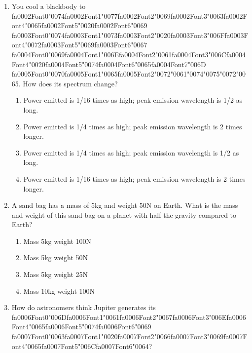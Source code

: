 \documentclass[12pt]{article}
\begin{document}
\begin{enumerate}[label=\arabic*.]
\item You cool a blackbody to {\csname fa0002Font0\endcsname\char"0074}{\csname fa0002Font1\endcsname\char"0077}{\csname fa0002Font2\endcsname\char"0069}{\csname fa0002Font3\endcsname\char"0063}{\csname fa0002Font4\endcsname\char"0065}{\csname fa0002Font5\endcsname\char"0020}{\csname fa0002Font6\endcsname\char"0069} {\csname fa0003Font0\endcsname\char"0074}{\csname fa0003Font1\endcsname\char"0073}{\csname fa0003Font2\endcsname\char"0020}{\csname fa0003Font3\endcsname\char"006F}{\csname fa0003Font4\endcsname\char"0072}{\csname fa0003Font5\endcsname\char"0069}{\csname fa0003Font6\endcsname\char"0067} {\csname fa0004Font0\endcsname\char"0069}{\csname fa0004Font1\endcsname\char"006E}{\csname fa0004Font2\endcsname\char"0061}{\csname fa0004Font3\endcsname\char"006C}{\csname fa0004Font4\endcsname\char"0020}{\csname fa0004Font5\endcsname\char"0074}{\csname fa0004Font6\endcsname\char"0065}{\csname fa0004Font7\endcsname\char"006D} {\csname fa0005Font0\endcsname\char"0070}{\csname fa0005Font1\endcsname\char"0065}{\csname fa0005Font2\endcsname\char"0072}{\char"0061}{\char"0074}{\char"0075}{\char"0072}{\char"0065}. How does its spectrum change?
\begin{enumerate}[label=(\alph*)]
    \item Power emitted is 1/16 times as high; peak emission wavelength is 1/2 as long.
    \item Power emitted is 1/4 times as high; peak emission wavelength is 2 times longer.
    \item Power emitted is 1/4 times as high; peak emission wavelength is 1/2 as long.
    \item Power emitted is 1/16 times as high; peak emission wavelength is 2 times longer.
\end{enumerate}
\item A sand bag has a mass of 5kg and weight 50N on Earth. What is the mass and weight of this
sand bag on a planet with half the gravity compared to Earth?
\begin{enumerate}[label=(\alph*)]
    \item Mass 5kg weight 100N
    \item Mass 5kg weight 50N
    \item Mass 5kg weight 25N
    \item Mass 10kg weight 100N
\end{enumerate}
\item How do astronomers think Jupiter generates its {\csname fa0006Font0\endcsname\char"006D}{\csname fa0006Font1\endcsname\char"0061}{\csname fa0006Font2\endcsname\char"0067}{\csname fa0006Font3\endcsname\char"006E}{\csname fa0006Font4\endcsname\char"0065}{\csname fa0006Font5\endcsname\char"0074}{\csname fa0006Font6\endcsname\char"0069} {\csname fa0007Font0\endcsname\char"0063}{\csname fa0007Font1\endcsname\char"0020}{\csname fa0007Font2\endcsname\char"0066}{\csname fa0007Font3\endcsname\char"0069}{\csname fa0007Font4\endcsname\char"0065}{\csname fa0007Font5\endcsname\char"006C}{\csname fa0007Font6\endcsname\char"0064}?

\end{enumerate}
\end{document}
